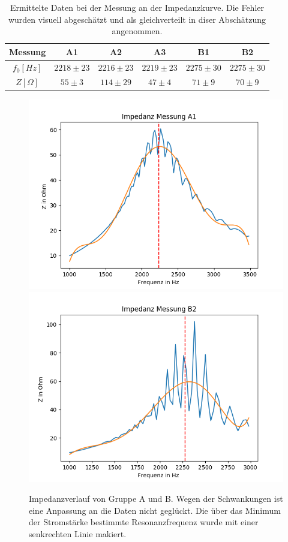 \documentclass[12pt,a4paper]{article}
\begin{document}
\begin{table}
\centering
\begin{tabular}{|c|c|c|c||c|c|}
\hline
Messung & A1 & A2 & A3 & B1 & B2\\
\hline
$f_0[Hz]$ & $2218\pm 23$ & $2216\pm 23$ & $2219\pm 23$ & $2275\pm 30$ & $2275\pm 30$\\
\hline
$Z[\Omega]$ & $55\pm 3$ & $114\pm 29$ & $47\pm 4$ & $71\pm 9$ & $70\pm 9$\\
\hline
\end{tabular}
\caption{Ermittelte Daten bei der Messung an der Impedanzkurve. Die Fehler wurden visuell abgeschätzt und als gleichverteilt in diser Abschätzung angenommen.}
\label{tab:Parallel_Impedanz}
\end{table}

\begin{figure}
\centering
\includegraphics[scale=1]{Bilder/Parallel_Impedanz.png}
\includegraphics[scale=1]{Bilder/Parallel_ImpedanzB.png}
\caption{Impedanzverlauf von Gruppe A und B. Wegen der Schwankungen ist eine Anpassung an die Daten nicht geglückt. Die über das Minimum der Stromstärke bestimmte Resonanzfrequenz wurde mit einer senkrechten Linie makiert.}
\label{fig:parallel_Impedanz}
\end{figure}
\end{document}

